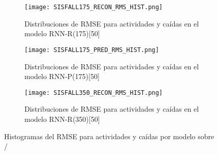 \begin{figure}[!ht]
  \centering
  \begin{subfigure}[b]{0.31\textwidth}
      \centering
      \texttt{[image: SISFALL175\_RECON\_RMS\_HIST.png]}
      \caption{\footnotesize \label{fig:ifell:sisfall:rmshist:175:recon}Distribuciones de RMSE para actividades y caídas en el modelo RNN-R(175)[50]}
  \end{subfigure}
  \hfill
  \begin{subfigure}[b]{0.31\textwidth}
      \centering
      \texttt{[image: SISFALL175\_PRED\_RMS\_HIST.png]}
      \caption{\footnotesize \label{fig:ifell:sisfall:rmshisit:175:pred}Distribuciones de RMSE para actividades y caídas en el modelo RNN-P(175)[50]}
  \end{subfigure}
  \hfill
  \begin{subfigure}[b]{0.31\textwidth}
      \centering
      \texttt{[image: SISFALL350\_RECON\_RMS\_HIST.png]}
      \caption{\footnotesize \label{fig:ifell:sisfall:rmshist:350:pred}Distribuciones de RMSE para actividades y caídas en el modelo RNN-R(350)[50]}
  \end{subfigure}
  \caption{\footnotesize \label{fig:ifell:sisfall:rmshist}Histogramas del RMSE para actividades y caídas por modelo sobre \sisfall/}
\end{figure}




